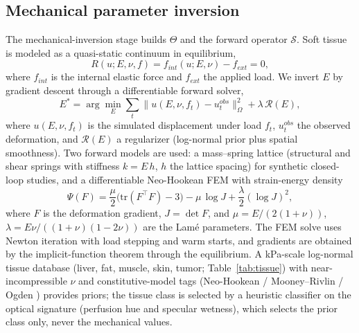 \documentclass[review]{elsarticle}
\begin{document}
\subsection{Mechanical parameter inversion}
\label{sec:tier3}
The mechanical-inversion stage builds $\Theta$ and the forward operator $\mathcal{S}$. Soft tissue
is modeled as a quasi-static continuum in equilibrium,
\begin{equation}
R(u; E, \nu, f) = f_{int}(u; E, \nu) - f_{ext} = 0,
\label{eq:equilibrium}
\end{equation}
where $f_{int}$ is the internal elastic force and $f_{ext}$ the applied
load. We invert $E$ by gradient descent through a differentiable forward
solver,
\begin{equation}
E^* = \arg\min_{E} \sum_{t} \big\| u(E, \nu, f_t) - u_t^{obs} \big\|_{\Omega}^{2} + \lambda\,\mathcal{R}(E),
\label{eq:inversion}
\end{equation}
where $u(E,\nu,f_t)$ is the simulated displacement under load $f_t$,
$u_t^{obs}$ the observed deformation, and $\mathcal{R}(E)$ a regularizer
(log-normal prior plus spatial smoothness). Two forward models are used: a
mass--spring lattice (structural and shear springs with stiffness
$k = E\,h$, $h$ the lattice spacing) for synthetic closed-loop studies, and
a differentiable Neo-Hookean FEM \citep{holzapfel2000,ogden1997,fung1993}
with strain-energy density
\begin{equation}
\Psi(F) = \frac{\mu}{2}\big(\mathrm{tr}(F^{\top}F) - 3\big) - \mu\,\log J + \frac{\lambda}{2}(\log J)^2,
\label{eq:neohookean}
\end{equation}
where $F$ is the deformation gradient, $J = \det F$, and
$\mu = E/(2(1+\nu))$, $\lambda = E\nu/((1+\nu)(1-2\nu))$ are the Lam\'e
parameters. The FEM solve uses Newton iteration with load stepping and warm
starts, and gradients are obtained by the implicit-function theorem through
the equilibrium. A kPa-scale log-normal tissue database (liver, fat,
muscle, skin, tumor; Table~\ref{tab:tissue}) with near-incompressible $\nu$
and constitutive-model tags (Neo-Hookean / Mooney--Rivlin
\citep{rivlin1948} / Ogden \citep{ogden1997}) provides priors; the tissue
class is selected by a heuristic classifier on the optical signature
(perfusion hue and specular wetness), which selects the prior class only,
never the mechanical values.
\end{document}
